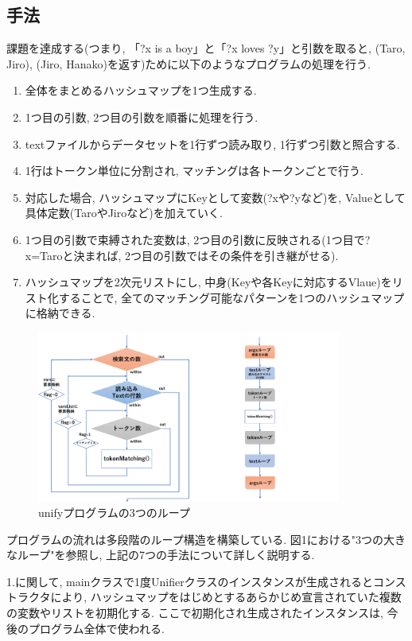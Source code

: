 \documentclass[12pt]{jarticle}
\begin{document}
\subsection{手法}
課題を達成する(つまり, 「?x is a boy」と「?x loves ?y」と引数を取ると, {(Taro, Jiro), (Jiro, Hanako)}を返す)ために以下のようなプログラムの処理を行う.

\begin{enumerate}
\item 全体をまとめるハッシュマップを1つ生成する.
\item 1つ目の引数, 2つ目の引数を順番に処理を行う.
\item textファイルからデータセットを1行ずつ読み取り, 1行ずつ引数と照合する.
\item 1行はトークン単位に分割され, マッチングは各トークンごとで行う.
\item 対応した場合, ハッシュマップにKeyとして変数(?xや?yなど)を, Valueとして具体定数(TaroやJiroなど)を加えていく.
\item 1つ目の引数で束縛された変数は, 2つ目の引数に反映される(1つ目で?x=Taroと決まれば, 2つ目の引数ではその条件を引き継がせる).
\item ハッシュマップを2次元リストにし, 中身(Keyや各Keyに対応するVlaue)をリスト化することで, 全てのマッチング可能なパターンを1つのハッシュマップに格納できる.
\end{enumerate}

\begin{figure}[htbp]
 \begin{center}
  \includegraphics[width = 10cm, pagebox = cropbox, clip]{unify.pdf}
 \end{center}
 \caption[]{unifyプログラムの3つのループ}\label{fig:fig1.1}
\end{figure}

プログラムの流れは多段階のループ構造を構築している. 図1における"3つの大きなループ"を参照し, 上記の7つの手法について詳しく説明する.

1.に関して, mainクラスで1度Unifierクラスのインスタンスが生成されるとコンストラクタにより, ハッシュマップをはじめとするあらかじめ宣言されていた複数の変数やリストを初期化する. ここで初期化され生成されたインスタンスは, 今後のプログラム全体で使われる.
\end{document}
